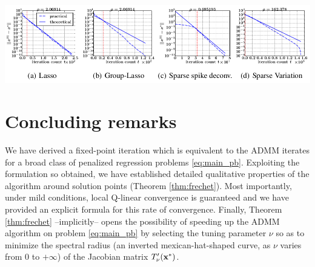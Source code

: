 \begin{pagefigure}
  \includegraphics[width=1\linewidth]{figures/admm.png}
  \caption{{Experimental results from ICASSP paper}~\citep{dohmatob2015local}\textbf{.} showing local Q-linear convergence for ADMM
    on problem \eqref{eq:main_pb}. %
    The ``theoretical'' line is the exponential
    curve $t \mapsto \|\x^{(0)} - \x^*\|r(\Lambda'(\x^*))^t$. The red broken
    vertical line marks the instant the support of the fixed-point $\x^*$
    is identified.
  }
\end{pagefigure}

\section{Concluding remarks}
We have derived a fixed-point iteration which is equivalent to the
ADMM iterates for a broad class of penalized regression problems
\eqref{eq:main_pb}. Exploiting the formulation so obtained, we  have
established detailed qualitative properties of the algorithm around
solution points (Theorem \ref{thm:frechet}). Most importantly, under
mild conditions, local
Q-linear convergence is guaranteed and we have provided an explicit
formula for this rate of convergence. %
Finally, Theorem \ref{thm:frechet} --implicitly--
opens the possibility of speeding up the ADMM algorithm on problem
\eqref{eq:main_pb} by selecting the tuning parameter $\nu$ so as to
minimize the spectral radius (an inverted mexican-hat-shaped curve, as
$\nu$ varies from $0$ to $+\infty$) of the Jacobian matrix
$T'_\nu(\mathbf{x}^*)$.




